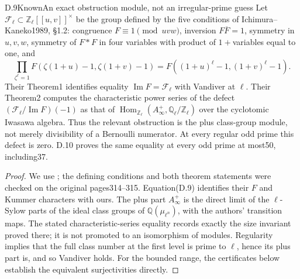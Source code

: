 \begin{statement}{D.9}{Known}{An exact obstruction module, not an irregular-prime guess}
Let $\mathcal F_\ell\subset\mathbb Z_\ell[[u,v]]^\times$ be the group defined by the five conditions of Ichimura--Kaneko1989, \S1.2: congruence $F\equiv1\pmod{uvw}$, inversion $F\overline F=1$, symmetry in $u,v,w$, symmetry of $F*F$ in four variables with product of $1+$variables equal to one, and
\[
 \prod_{\zeta^\ell=1}F(\zeta(1+u)-1,\zeta(1+v)-1)
       =F((1+u)^\ell-1,(1+v)^\ell-1).
\]
Their Theorem1 identifies equality $\operatorname{Im}F=\mathcal F_\ell$ with Vandiver at $\ell$. Their Theorem2 computes the characteristic power series of the defect $(\mathcal F_\ell/\operatorname{Im}F)(-1)$ as that of
$\operatorname{Hom}_{\mathbb Z_\ell}(A_\infty^+,\mathbb Q_\ell/\mathbb Z_\ell)$ over the cyclotomic Iwasawa algebra. Thus the relevant obstruction is the plus class-group module, not merely divisibility of a Bernoulli numerator. At every regular odd prime this defect is zero. D.10 proves the same equality at every odd prime at most50, including37.
\end{statement}
\begin{proof}
We use \cite[Theorems1--2]{dIchimuraKaneko1989}; the defining conditions and both theorem statements were checked on the original pages314--315. Equation(D.9) identifies their $F$ and Kummer characters with ours. The plus part $A_\infty^+$ is the direct limit of the $\ell$-Sylow parts of the ideal class groups of $\mathbb Q(\mu_{\ell^n})$, with the authors' transition maps. The stated characteristic-series equality records exactly the size invariant proved there; it is not promoted to an isomorphism of modules. Regularity implies that the full class number at the first level is prime to $\ell$, hence its plus part is, and so Vandiver holds. For the bounded range, the certificates below establish the equivalent surjectivities directly.
\end{proof}

